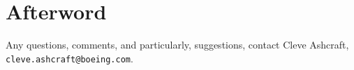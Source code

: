 \par
\section{Afterword}
\par
Any questions, comments, and particularly, suggestions,
contact Cleve Ashcraft, {\tt cleve.ashcraft@boeing.com}.
